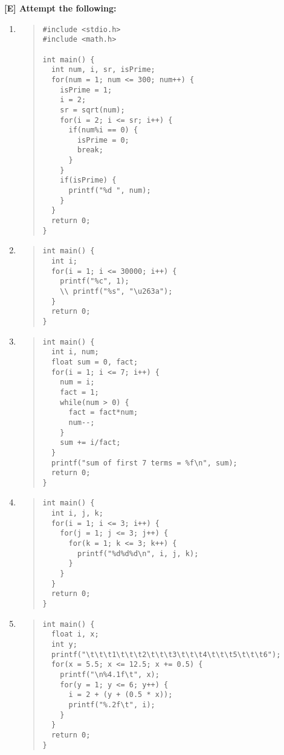 \documentclass{report}
\begin{document}
\textbf{[E] Attempt the following:}
\begin{enumerate}
    \renewcommand{\labelenumi}{\alph{enumi}}
  \item \begin{quote} \begin{verbatim} 
#include <stdio.h>
#include <math.h>

int main() {
  int num, i, sr, isPrime;
  for(num = 1; num <= 300; num++) {
    isPrime = 1;
    i = 2;
    sr = sqrt(num);
    for(i = 2; i <= sr; i++) {
      if(num%i == 0) {
        isPrime = 0;
        break;
      }
    }
    if(isPrime) {
      printf("%d ", num);
    }
  }
  return 0;
}
  \end{verbatim} \end{quote}

  \item \begin{quote} \begin{verbatim} 
int main() {
  int i;
  for(i = 1; i <= 30000; i++) {
    printf("%c", 1);
    \\ printf("%s", "\u263a");
  }
  return 0;
}
  \end{verbatim} \end{quote}

  \item \begin{quote} \begin{verbatim} 
int main() {
  int i, num;
  float sum = 0, fact;
  for(i = 1; i <= 7; i++) {
    num = i;
    fact = 1;
    while(num > 0) {
      fact = fact*num;
      num--;
    }
    sum += i/fact;
  }
  printf("sum of first 7 terms = %f\n", sum);
  return 0;
}
  \end{verbatim} \end{quote}

  \item \begin{quote} \begin{verbatim} 
int main() {
  int i, j, k;
  for(i = 1; i <= 3; i++) {
    for(j = 1; j <= 3; j++) {
      for(k = 1; k <= 3; k++) {
        printf("%d%d%d\n", i, j, k);
      }
    }
  }
  return 0;
}
  \end{verbatim} \end{quote}

  \item \begin{quote} \begin{verbatim} 
int main() {
  float i, x;
  int y;
  printf("\t\t\t1\t\t\t2\t\t\t3\t\t\t4\t\t\t5\t\t\t6");
  for(x = 5.5; x <= 12.5; x += 0.5) {
    printf("\n%4.1f\t", x);
    for(y = 1; y <= 6; y++) {
      i = 2 + (y + (0.5 * x));
      printf("%.2f\t", i);
    }
  }
  return 0;
}
  \end{verbatim} \end{quote}


\end{enumerate}
\end{document}
